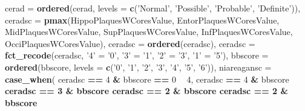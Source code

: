 \documentclass[]{book}
\newenvironment{Shaded}{\begin{snugshade}}{\end{snugshade}}
\newcommand{\DataTypeTok}[1]{\textcolor[rgb]{0.13,0.29,0.53}{#1}}
\newcommand{\DecValTok}[1]{\textcolor[rgb]{0.00,0.00,0.81}{#1}}
\newcommand{\KeywordTok}[1]{\textcolor[rgb]{0.13,0.29,0.53}{\textbf{#1}}}
\newcommand{\NormalTok}[1]{#1}
\newcommand{\OperatorTok}[1]{\textcolor[rgb]{0.81,0.36,0.00}{\textbf{#1}}}
\newcommand{\StringTok}[1]{\textcolor[rgb]{0.31,0.60,0.02}{#1}}
\begin{document}
\begin{Shaded}
\begin{Highlighting}[]
{{{{        \DataTypeTok{cerad =} \KeywordTok{ordered}\NormalTok{(cerad, }\DataTypeTok{levels =} \KeywordTok{c}\NormalTok{(}\StringTok{'Normal'}\NormalTok{, }\StringTok{'Possible'}\NormalTok{, }\StringTok{'Probable'}\NormalTok{, }\StringTok{'Definite'}\NormalTok{)),}
        \DataTypeTok{ceradsc =} \KeywordTok{pmax}\NormalTok{(HippoPlaquesWCoresValue, EntorPlaquesWCoresValue, MidPlaquesWCoresValue, }
\NormalTok{                       SupPlaquesWCoresValue, InfPlaquesWCoresValue, OcciPlaquesWCoresValue),}
        \DataTypeTok{ceradsc =} \KeywordTok{ordered}\NormalTok{(ceradsc),}
        \DataTypeTok{ceradsc =} \KeywordTok{fct_recode}\NormalTok{(ceradsc, }\StringTok{'4'}\NormalTok{ =}\StringTok{ '0'}\NormalTok{, }\StringTok{'3'}\NormalTok{ =}\StringTok{ '1'}\NormalTok{, }\StringTok{'2'}\NormalTok{ =}\StringTok{ '3'}\NormalTok{, }\StringTok{'1'}\NormalTok{ =}\StringTok{ '5'}\NormalTok{),}
        \DataTypeTok{bbscore =} \KeywordTok{ordered}\NormalTok{(bbscore, }\DataTypeTok{levels =} \KeywordTok{c}\NormalTok{(}\StringTok{'0'}\NormalTok{, }\StringTok{'1'}\NormalTok{, }\StringTok{'2'}\NormalTok{, }\StringTok{'3'}\NormalTok{, }\StringTok{'4'}\NormalTok{, }\StringTok{'5'}\NormalTok{, }\StringTok{'6'}\NormalTok{)),}
        \DataTypeTok{niareagansc =} \KeywordTok{case_when}\NormalTok{(}
\NormalTok{          ceradsc }\OperatorTok{==}\StringTok{ }\DecValTok{4} \OperatorTok{&}\StringTok{ }\NormalTok{bbscore }\OperatorTok{==}\StringTok{ }\DecValTok{0} \OperatorTok{~}\StringTok{ }\DecValTok{4}\NormalTok{, }
\NormalTok{          ceradsc }\OperatorTok{==}\StringTok{ }\DecValTok{4} \OperatorTok{&}\StringTok{ }\NormalTok{bbscore }\OperatorTok{%in%}\StringTok{ }\KeywordTok{c}\NormalTok{(}\DecValTok{1}\OperatorTok{:}\DecValTok{6}\NormalTok{) }\OperatorTok{~}\StringTok{ }\DecValTok{3}\NormalTok{, }
\NormalTok{          ceradsc }\OperatorTok{==}\StringTok{ }\DecValTok{3} \OperatorTok{&}\StringTok{ }\NormalTok{bbscore }\OperatorTok{%in%}\StringTok{ }\KeywordTok{c}\NormalTok{(}\DecValTok{0}\OperatorTok{:}\DecValTok{6}\NormalTok{) }\OperatorTok{~}\StringTok{ }\DecValTok{3}\NormalTok{, }
\NormalTok{          ceradsc }\OperatorTok{==}\StringTok{ }\DecValTok{2} \OperatorTok{&}\StringTok{ }\NormalTok{bbscore }\OperatorTok{%in%}\StringTok{ }\KeywordTok{c}\NormalTok{(}\DecValTok{0}\OperatorTok{:}\DecValTok{2}\NormalTok{) }\OperatorTok{~}\StringTok{ }\DecValTok{3}\NormalTok{,}
\NormalTok{          ceradsc }\OperatorTok{==}\StringTok{ }\DecValTok{2} \OperatorTok{&}\StringTok{ }\NormalTok{bbscore }\OperatorTok{%in%}\StringTok{ }\KeywordTok{c}\NormalTok{(}\DecValTok{3}\OperatorTok{:}\DecValTok{6}\NormalTok{) }\OperatorTok{~}\StringTok{ }\DecValTok{2}\NormalTok{,}
}}}}}}}}
\end{Highlighting}
\end{Shaded}
\end{document}
